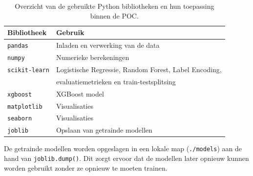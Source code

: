 \begin{table}[H]
    \centering
    \small
    \begin{tabular}{ll}
        \toprule
        \textbf{Bibliotheek} & \textbf{Gebruik} \\
        \midrule
        \texttt{pandas}      & Inladen en verwerking van de data \\
        \texttt{numpy}       & Numerieke berekeningen \\
        \texttt{scikit-learn} & Logistische Regressie, Random Forest, Label Encoding, \\
        & evaluatiemetrieken en train-testsplitsing \\
        \texttt{xgboost}     & XGBoost model \\
        \texttt{matplotlib}  & Visualisaties \\
        \texttt{seaborn}     & Visualisaties \\
        \texttt{joblib}      & Opslaan van getrainde modellen \\
        \bottomrule
    \end{tabular}
    \caption[Gebruikte bibliotheken]{\label{tab:bibliotheken}Overzicht van de gebruikte Python bibliotheken en hun toepassing binnen de POC.}
\end{table}

De getrainde modellen worden opgeslagen in een lokale map (\texttt{./models}) aan de hand van \texttt{joblib.dump()}. Dit zorgt ervoor dat de modellen later opnieuw kunnen worden gebruikt zonder ze opnieuw te moeten trainen.